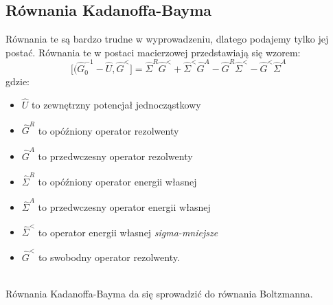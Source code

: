 \subsection{Równania Kadanoffa-Bayma}
Równania te są bardzo trudne w wyprowadzeniu, dlatego podajemy tylko jej postać. Równania te w postaci macierzowej przedstawiają się wzorem:
\begin{equation}
\Big[(\hat{G}_0^{-1}-\hat{U},\hat{G}^<\Big]=
\hat{\Sigma}^{R}\hat{G}^<+\hat{\Sigma}^{<}\hat{G}^A
-\hat{G}^R\hat{\Sigma}^{<}-\hat{G}^<\hat{\Sigma}^{A}
\end{equation}
gdzie:\\
\begin{itemize}
\item $\hat{U}$ to zewnętrzny potencjał jednocząstkowy\\
\item $\hat{G}^R$ to opóźniony operator rezolwenty\\
\item $\hat{G}^A$ to przedwczesny operator rezolwenty\\
\item $\hat{\Sigma}^R$ to opóźniony operator energii własnej\\
\item $\hat{\Sigma}^A$ to przedwczesny operator energii własnej\\
\item $\hat{\Sigma}^<$ to operator energii własnej \textit{sigma-mniejsze}\\
\item $\hat{G}^<$ to swobodny operator rezolwenty.\\\\
\end{itemize}
Równania Kadanoffa-Bayma da się sprowadzić do równania Boltzmanna.

